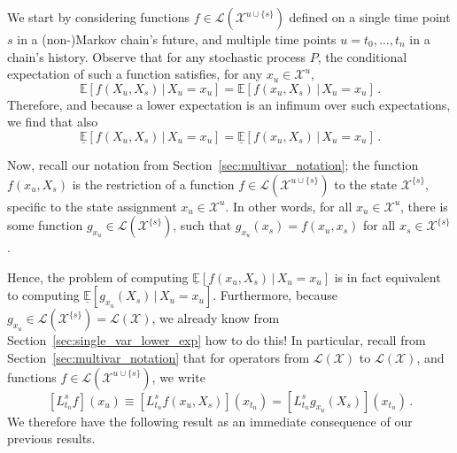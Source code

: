 \documentclass[10pt]{paper}
\theoremstyle{definition}
\newcommand{\states}{\mathcal{X}}
\newcommand{\gambles}{\mathcal{L}}
\newcommand{\gamblesX}{\gambles(\states)}
\begin{document}
We start by considering functions $f\in\gambles(\states^{u\cup\{s\}})$ defined on a single time point $s$ in a (non-)Markov chain's future, and multiple time points $u=t_0,\ldots,t_n$ in a chain's history. Observe that for any stochastic process $P$, the conditional expectation of such a function satisfies, for any $x_u\in\states^u$,
\begin{equation*}
\mathbb{E}[f(X_u,X_s)\,\vert\,X_u=x_u] = \mathbb{E}[f(x_u,X_s)\,\vert\,X_u=x_u]\,.
\end{equation*}
Therefore, and because a lower expectation is an infimum over such expectations, we find that also
\begin{equation*}
\underline{\mathbb{E}}[f(X_u,X_s)\,\vert\,X_u=x_u] = \underline{\mathbb{E}}[f(x_u,X_s)\,\vert\,X_u=x_u]\,.
\end{equation*}

Now, recall our notation from Section~\ref{sec:multivar_notation}; the function $f(x_u,X_s)$ is the restriction of a function $f\in\gambles(\states^{u\cup\{s\}})$ to the state $\states^{\{s\}}$, specific to the state assignment $x_u\in\states^u$. In other words, for all $x_u\in\states^u$, there is some function $g_{x_u}\in\gambles(\states^{\{s\}})$, such that $g_{x_u}(x_s)=f(x_u,x_s)$ for all $x_s\in\states^{\{s\}}$.

Hence, the problem of computing $\underline{\mathbb{E}}[f(x_u,X_s)\,\vert\,X_u=x_u]$ is in fact equivalent to computing $\underline{\mathbb{E}}[g_{x_u}(X_s)\,\vert\,X_u=x_u]$. Furthermore, because $g_{x_u}\in\gambles(\states^{\{s\}})=\gamblesX$, we already know from Section~\ref{sec:single_var_lower_exp} how to do this! In particular, recall from Section~\ref{sec:multivar_notation} that for operators from $\gamblesX$ to $\gamblesX$, and functions $f\in\gambles(\states^{u\cup\{s\}})$, we write
\begin{equation*}
\left[L_{t_n}^sf\right](x_u) \equiv \left[L_{t_n}^sf(x_u,X_s)\right](x_{t_n}) = \left[L_{t_n}^sg_{x_u}(X_s)\right](x_{t_n})\,.
\end{equation*}
We therefore have the following result as an immediate consequence of our previous results.
\end{document}
